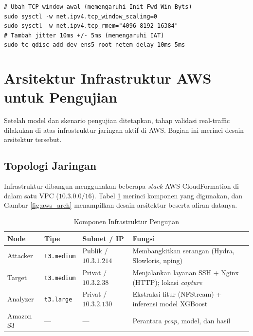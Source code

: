 \documentclass[11pt, a4paper]{article}
\begin{document}
\begin{lstlisting}[style=bash, caption={Aktivasi perturbasi evasion (potongan attack\_evasion.sh)}]
# Ubah TCP window awal (memengaruhi Init Fwd Win Byts)
sudo sysctl -w net.ipv4.tcp_window_scaling=0
sudo sysctl -w net.ipv4.tcp_rmem="4096 8192 16384"
# Tambah jitter 10ms +/- 5ms (memengaruhi IAT)
sudo tc qdisc add dev ens5 root netem delay 10ms 5ms
\end{lstlisting}

\section{Arsitektur Infrastruktur AWS untuk Pengujian}

Setelah model dan skenario pengujian ditetapkan, tahap validasi real-traffic dilakukan di atas infrastruktur jaringan aktif di AWS. Bagian ini merinci desain arsitektur tersebut.

\subsection{Topologi Jaringan}
Infrastruktur dibangun menggunakan beberapa \textit{stack} AWS CloudFormation di dalam satu VPC ($10.3.0.0/16$). Tabel \ref{tab:infra} merinci komponen yang digunakan, dan Gambar \ref{fig:aws_arch} menampilkan desain arsitektur beserta aliran datanya.

\begin{table}[htbp]
\centering
\caption{Komponen Infrastruktur Pengujian}
\label{tab:infra}
\small
\begin{tabularx}{\linewidth}{@{} l l l X @{}}
\toprule
\textbf{Node} & \textbf{Tipe} & \textbf{Subnet / IP} & \textbf{Fungsi} \\ \midrule
Attacker & \texttt{t3.medium} & Publik / $10.3.1.214$ & Membangkitkan serangan (Hydra, Slowloris, nping) \\ \addlinespace
Target & \texttt{t3.medium} & Privat / $10.3.2.38$ & Menjalankan layanan SSH + Nginx (HTTP); lokasi \textit{capture} \\ \addlinespace
Analyzer & \texttt{t3.large} & Privat / $10.3.2.130$ & Ekstraksi fitur (NFStream) + inferensi model XGBoost \\ \addlinespace
Amazon S3 & --- & --- & Perantara \textit{pcap}, model, dan hasil \\ \bottomrule
\end{tabularx}
\end{table}
\end{document}
